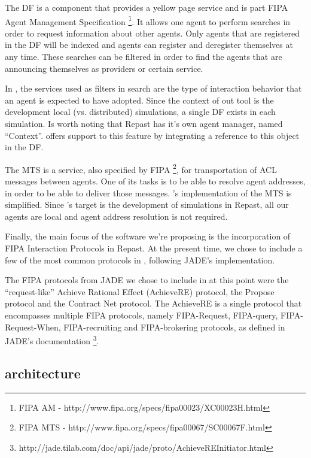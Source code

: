 The DF is a component that provides a yellow page service and is part FIPA Agent Management Specification \footnote{FIPA AM - http://www.fipa.org/specs/fipa00023/XC00023H.html}. It allows one agent to perform searches in order to request information about other agents. Only agents that are registered in the DF will be indexed and agents can register and deregister themselves at any time. These searches can be filtered in order to find the agents that are announcing themselves as providers or certain service. 

In \apiname{}, the services used as filters in search are the type of interaction behavior that an agent is expected to have adopted. Since the context of out tool is the development local (vs. distributed) simulations, a single DF exists in each simulation. Is worth noting that Repast has it's own agent manager, named ``Context''. \apiname{} offers support to this feature by integrating a reference to this object in the DF.

The MTS is a service, also specified by FIPA \footnote{FIPA MTS - http://www.fipa.org/specs/fipa00067/SC00067F.html}, for transportation of ACL messages between agents. One of its tasks is to be able to resolve agent addresses, in order to be able to deliver those messages. \apiname{}'s implementation of the MTS is simplified. Since \apiname{}'s target is the development of simulations in Repast, all our agents are local and agent address resolution is not required.

Finally, the main focus of the software we're proposing is the incorporation of FIPA Interaction Protocols in Repast. At the present time, we chose to include a few of the most common protocols in \apiname{}, following JADE's implementation.

The FIPA protocols from JADE we chose to include in \apiname{} at this point were the ``request-like'' Achieve Rational Effect (AchieveRE) protocol, the Propose protocol and the Contract Net protocol. The AchieveRE is a single protocol that encompasses multiple FIPA protocols, namely FIPA-Request, FIPA-query, FIPA-Request-When, FIPA-recruiting and FIPA-brokering protocols, as defined in JADE's documentation \footnote{http://jade.tilab.com/doc/api/jade/proto/AchieveREInitiator.html}.

\subsection{\apiname{} architecture}

